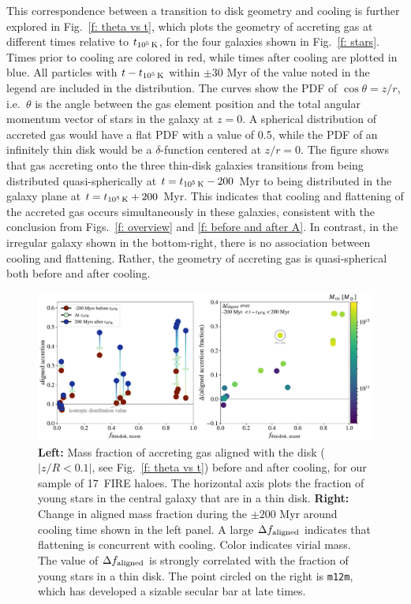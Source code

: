 \documentclass[fleqn,usenatbib]{mnras}
\newcommand{\tcools}{t_{10^5\,{\rm K}}}
\newcommand{\Nsample}{17}
\begin{document}
This correspondence between a transition to disk geometry and cooling is further explored in Fig.~\ref{f: theta vs t}, which plots the geometry of accreting gas at different times relative to $\tcools$, for the four galaxies shown in Fig.~\ref{f: stars}. 
Times prior to cooling are colored in red, while times after cooling are plotted in blue.
All particles with $t-\tcools$ within $\pm$30 Myr of the value noted in the legend are included in the distribution. 
The curves show the PDF of $\cos \theta = z/r$, i.e.\ $\theta$ is the angle between the gas element position and the total angular momentum vector of stars in the galaxy at $z=0$.
A spherical distribution of accreted gas would have a flat PDF with a value of 0.5, while 
the PDF of an infinitely thin disk would be a $\delta$-function centered at $z/r = 0$.
The figure shows that gas accreting onto the three thin-disk galaxies transitions from being distributed quasi-spherically at $t = \tcools-200$ Myr to being distributed in the galaxy plane at $t = \tcools+200$ Myr.
This indicates that cooling and flattening of the accreted gas occurs simultaneously in these galaxies, consistent with the conclusion from Figs.~\ref{f: overview} and \ref{f: before and after A}.
In contrast, in the irregular galaxy shown in the bottom-right, there is no association between cooling and flattening.
Rather, the geometry of accreting gas is quasi-spherical both before and after cooling.

\begin{figure}
    \centering
    \includegraphics[width=\textwidth]{figures/prevalence/aligned_fraction.pdf}
    \caption{
    \textbf{Left:}
    Mass fraction of accreting gas aligned with the disk ($\vert z/R < 0.1 \vert$, see Fig.~\ref{f: theta vs t}) before and after cooling, for our sample of \Nsample~FIRE haloes.
    The horizontal axis plots the fraction of young stars in the central galaxy that are in a thin disk.
    \textbf{Right:}
    Change in aligned mass fraction during the $\pm200$ Myr around cooling time shown in the left panel.
    A large $\Delta f_{\rm aligned}$ indicates that flattening is concurrent with cooling.
    Color indicates virial mass.
    The value of $\Delta f_{\rm aligned}$ is strongly correlated with the fraction of young stars in a thin disk. %
    The point circled on the right is \texttt{m12m}, which has developed a sizable secular bar at late times.
    }
    \label{f: prevalence}
\end{figure}
\end{document}
